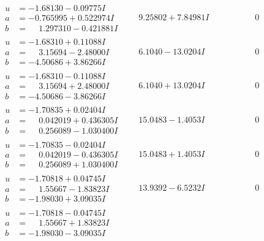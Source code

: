 \documentclass[1p]{elsarticle_modified}
\theoremstyle{definition}
\begin{document}
$$\begin{array}{c|c|c}
\begin{aligned}
u &= -1.68130 - 0.09775 I \\
a &= -0.765995 + 0.522974 I \\
b &= \phantom{-}1.297310 - 0.421881 I\end{aligned}
 & \phantom{-}9.25802 + 7.84981 I & \phantom{-0.000000 } 0 \\ \hline\begin{aligned}
u &= -1.68310 + 0.11088 I \\
a &= \phantom{-}3.15694 - 2.48000 I \\
b &= -4.50686 + 3.86266 I\end{aligned}
 & \phantom{-}6.1040 - 13.0204 I & \phantom{-0.000000 } 0 \\ \hline\begin{aligned}
u &= -1.68310 - 0.11088 I \\
a &= \phantom{-}3.15694 + 2.48000 I \\
b &= -4.50686 - 3.86266 I\end{aligned}
 & \phantom{-}6.1040 + 13.0204 I & \phantom{-0.000000 } 0 \\ \hline\begin{aligned}
u &= -1.70835 + 0.02404 I \\
a &= \phantom{-}0.042019 + 0.436305 I \\
b &= \phantom{-}0.256089 - 1.030400 I\end{aligned}
 & \phantom{-}15.0483 - 1.4053 I & \phantom{-0.000000 } 0 \\ \hline\begin{aligned}
u &= -1.70835 - 0.02404 I \\
a &= \phantom{-}0.042019 - 0.436305 I \\
b &= \phantom{-}0.256089 + 1.030400 I\end{aligned}
 & \phantom{-}15.0483 + 1.4053 I & \phantom{-0.000000 } 0 \\ \hline\begin{aligned}
u &= -1.70818 + 0.04745 I \\
a &= \phantom{-}1.55667 - 1.83823 I \\
b &= -1.98030 + 3.09035 I\end{aligned}
 & \phantom{-}13.9392 - 6.5232 I & \phantom{-0.000000 } 0 \\ \hline\begin{aligned}
u &= -1.70818 - 0.04745 I \\
a &= \phantom{-}1.55667 + 1.83823 I \\
b &= -1.98030 - 3.09035 I\end{aligned}

\end{array}$$
\end{document}
